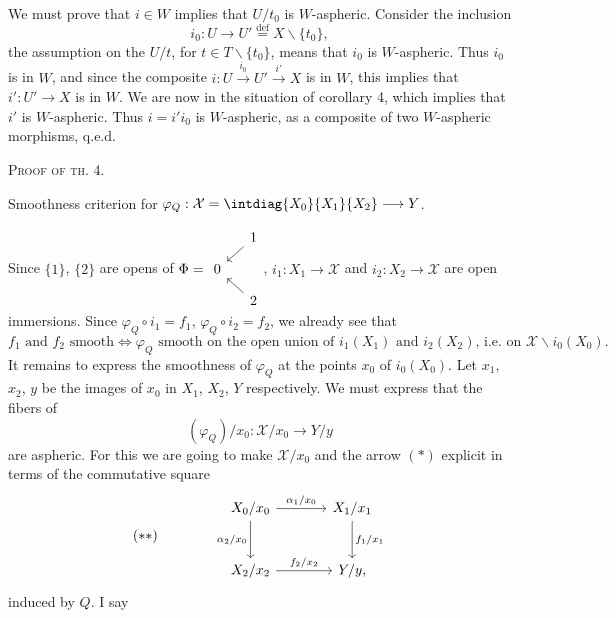 We must prove that $i\in W$ implies that $U/t_0$ is $W$-aspheric. Consider the inclusion
\[
i_0 : U\longrightarrow U' \overset{\text{def}}{=} X\backslash\{t_0\},
\]
the assumption on the $U/t$, for $t\in T\backslash\{t_0\}$, means that $i_0$ is $W$-aspheric. Thus $i_0$ is in $W$, and since the composite $i : U\xrightarrow{i_0} U'\xrightarrow{i'} X$ is in $W$, this implies that
$i' : U'\longrightarrow X$ is in $W$. We are now in the situation of corollary 4, which implies that $i'$ is $W$-aspheric. Thus $i=i'i_0$ is $W$-aspheric, as a composite of two $W$-aspheric morphisms, q.e.d.

\noindent\textsc{Proof of th. 4.}

\noindent{} Smoothness criterion for $\varphi_Q : \mathcal{X} = \intdiag{X_0}{X_1}{X_2} \longrightarrow Y$.

Since $\{1\}$, $\{2\}$ are opens of $\Phi = \begin{tikzcd}[row sep=small,column sep=small,baseline=(\tikzcdmatrixname-2-1.base)]
 & 1 \arrow[dl] \\
 0 & \\
 & 2 \arrow[ul]
\end{tikzcd}$, $i_1 : X_1\longrightarrow\mathcal{X}$ and $i_2 : X_2\longrightarrow\mathcal{X}$ are open immersions. Since $\varphi_Q\circ i_1 = f_1$,
$\varphi_Q\circ i_2=f_2$, we already see that
\[
f_1 \text{ and } f_2 \text{ smooth} \iff \varphi_Q \text{ smooth on the open union of } i_1(X_1) \text{ and } i_2(X_2)\text{, i.e. on } \mathcal{X}\backslash i_0(X_0).
\]
It remains to express the smoothness of $\varphi_Q$ at the points $x_0$ of $i_0(X_0)$. Let $x_1$, $x_2$, $y$ be the images of $x_0$ in $X_1$, $X_2$, $Y$ respectively. We must express that the fibers of
\[
(\varphi_Q)/x_0 : \mathcal{X}/x_0\longrightarrow Y/y \tag*{$(*)$}
\]
are aspheric. For this we are going to make $\mathcal{X}/x_0$ and the arrow $(*)$ explicit in terms of the commutative square
\[
(**)\qquad\qquad
\begin{tikzcd}[row sep=large,column sep=large]
X_0/x_0 \arrow[r, "\alpha_1/x_0"] \arrow[d, "\alpha_2/x_0"'] & X_1/x_1 \arrow[d, "f_1/x_1"] \\
X_2/x_2 \arrow[r, "f_2/x_2"] & Y/y,
\end{tikzcd}
\]
induced by $Q$. I say


